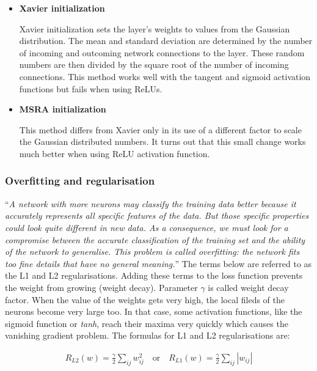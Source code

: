 \begin{itemize}
	\item \textbf{Xavier initialization}
		
	Xavier initialization sets the layer’s weights to values from the Gaussian distribution. The mean and standard deviation are determined by the number of incoming and outcoming network connections to the layer. These random numbers are then divided by the square root of the number of incoming connections. This method works well with the tangent and sigmoid activation functions but fails when using ReLUs. 
	
	\item \textbf{MSRA initialization}

	This method differs from Xavier only in its use of a different factor to scale the Gaussian distributed numbers. It turns out that this small change works much better when using ReLU activation function. 
	
\end{itemize}

\subsubsection{Overfitting and regularisation}

\enquote{\textit{A network with more neurons may classify the training data better because it accurately represents all specific features of the data. But those specific properties could look quite different in new data. As a consequence, we must look for a compromise between the accurate classification of the training set and the ability of the network to generalise. This problem is called overfitting: the network fits too fine details that have no general meaning.}} \cite{mehlig} The terms below are referred to as the L1 and L2 regularisations. Adding these terms to the loss function prevents the weight from growing (weight decay). Parameter $ \gamma $ is called weight decay factor. When the value of the weights gets very high, the local fileds of the neurons become very large too. In that case, some activation functions, like the sigmoid function or \textit{tanh}, reach their maxima very quickly which causes the vanishing gradient problem. The formulas for L1 and L2 regularisations are: \cite{mehlig}

\begin{gather}
	R_{L2}(w) = \frac{\gamma}{2} \sum\limits_{ij} w_{ij}^{2} \quad \text{or} \quad R_{L1}(w) = \frac{\gamma}{2} \sum\limits_{ij} |w_{ij}|
\end{gather}

